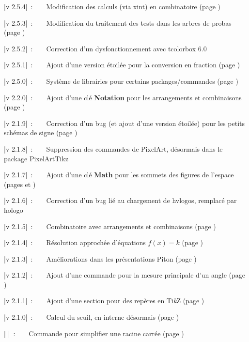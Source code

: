 \documentclass[a4paper,french,11pt]{article}
\providecommand\tikzlogo{Ti\textit{k}Z}
\let\TikZ\tikzlogo
\newcommand\Cle[1]{{\bfseries\sffamily\textlangle #1\textrangle}}
\begin{document}
{{{{{{{{{{{{{{{\small \bverb|v 2.5.4|~:~~~~Modification des calculs (via \textsf{xint}) en combinatoire (page \pageref{combinatoire})

{\small \bverb|v 2.5.3|~:~~~~Modification du traitement des tests dans les arbres de probas (page \pageref{arbresprobas})

{\small \bverb|v 2.5.2|~:~~~~Correction d'un dysfonctionnement avec \textsf{tcolorbox 6.0}

{\small \bverb|v 2.5.1|~:~~~~Ajout d'une version étoilée pour la conversion en fraction (page \pageref{convfrac})

{\small \bverb|v 2.5.0|~:~~~~Système de \textsf{librairies} pour certains packages/commandes (page \pageref{librairies})

{\small \bverb|v 2.2.0|~:~~~~Ajout d'une clé \Cle{Notation} pour les arrangements et combinaisons (page \pageref{combinatoire})

{\small \bverb|v 2.1.9|~:~~~~Correction d'un bug (et ajout d'une version étoilée) pour les petits schémas \og de signe \fg{} (page \pageref{aidesigne})

{\small \bverb|v 2.1.8|~:~~~~Suppression des commandes de PixelArt, désormais dans le package \textsf{PixelArtTikz}

{\small \bverb|v 2.1.7|~:~~~~Ajout d'une clé \Cle{Math} pour les sommets des figures de l'espace (pages \pageref{pave} et \pageref{tetra})

{\small \bverb|v 2.1.6|~:~~~~Correction d'un bug lié au chargement de \textsf{hvlogos}, remplacé par \textsf{hologo}

{\small \bverb|v 2.1.5|~:~~~~Combinatoire avec arrangements et combinaisons (page \pageref{combinatoire})

{\small \bverb|v 2.1.4|~:~~~~Résolution approchée d'équations $f(x)=k$ (page \pageref{resolapprox})

{\small \bverb|v 2.1.3|~:~~~~Améliorations dans les présentations \textsf{Piton} (page \pageref{pythonpiton})
	
{\small \bverb|v 2.1.2|~:~~~~Ajout d'une commande pour la mesure principale d'un angle (page \pageref{mesureprincipale})

{\small \bverb|v 2.1.1|~:~~~~Ajout d'une section pour des repères en \TikZ{} (page \pageref{reperagetikz})

{\small \bverb|v 2.1.0|~:~~~~Calcul du seuil, en interne désormais (page \pageref{calcrecurr})

{\small \bverb|       |~:~~~~Commande pour simplifier une racine carrée (page \pageref{simplracine})

}}}}}}}}}}}}}}}}}}}}}}}}}}}}}}}
\end{document}
